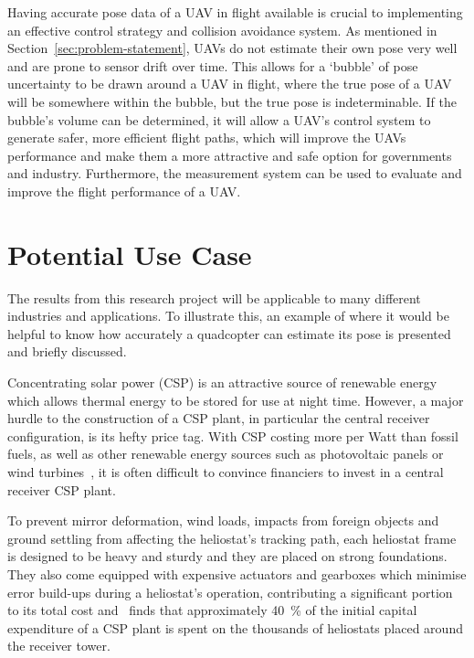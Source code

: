 Having accurate pose data of a UAV in flight available is crucial to implementing an effective control strategy and collision avoidance system. As mentioned in Section~\ref{sec:problem-statement}, UAVs do not estimate their own pose very well and are prone to sensor drift over time. This allows for a `bubble' of pose uncertainty to be drawn around a UAV in flight, where the true pose of a UAV will be somewhere within the bubble, but the true pose is indeterminable. If the bubble's volume can be determined, it will allow a UAV's control system to generate safer, more efficient flight paths, which will improve the UAVs performance and make them a more attractive and safe option for governments and industry. Furthermore, the measurement system can be used to evaluate and improve the flight performance of a UAV.\@ 

\section{Potential Use Case}

The results from this research project will be applicable to many different industries and applications. To illustrate this, an example of where it would be helpful to know how accurately a quadcopter can estimate its pose is presented and briefly discussed. 

Concentrating solar power (CSP) is an attractive source of renewable energy which allows thermal energy to be stored for use at night time. However, a major hurdle to the construction of a CSP plant, in particular the central receiver configuration, is its hefty price tag. With CSP costing more per Watt than fossil fuels, as well as other renewable energy sources such as photovoltaic panels or wind turbines~\citep{irena-renewable_cost}, it is often difficult to convince financiers to invest in a central receiver CSP plant.

To prevent mirror deformation, wind loads, impacts from foreign objects and ground settling from affecting the heliostat's tracking path, each heliostat frame is designed to be heavy and sturdy and they are placed on strong foundations. They also come equipped with expensive actuators and gearboxes which minimise error build-ups during a heliostat's operation, contributing a significant portion to its total cost and~\cite{pitz2005ecostar} finds that approximately 40~\% of the initial capital expenditure of a CSP plant is spent on the thousands of heliostats placed around the receiver tower. 

